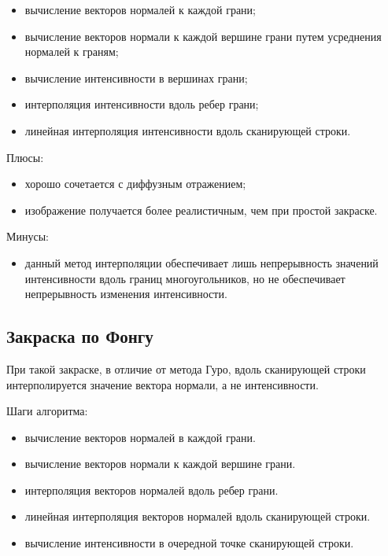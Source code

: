 \begin{itemize}
	\item вычисление векторов нормалей к каждой грани;
	\item вычисление векторов нормали к каждой вершине грани путем усреднения нормалей к граням;
	\item вычисление интенсивности в вершинах грани;
	\item интерполяция интенсивности вдоль ребер грани;
	\item линейная интерполяция интенсивности вдоль сканирующей строки.
\end{itemize}

Плюсы:

\begin{itemize}
	\item хорошо сочетается с диффузным отражением;
	\item изображение получается более реалистичным, чем при простой закраске.
\end{itemize}

Минусы:

\begin{itemize}
	\item данный метод интерполяции обеспечивает лишь непрерывность значений интенсивности вдоль границ многоугольников, но не обеспечивает непрерывность изменения интенсивности.
\end{itemize}


\subsection{Закраска по Фонгу}

При такой закраске, в отличие от метода Гуро, вдоль сканирующей строки интерполируется значение вектора нормали, а не интенсивности. 

Шаги алгоритма:

\begin{itemize}
	\item вычисление векторов нормалей в каждой грани.
	\item вычисление векторов нормали к каждой вершине грани.
	\item интерполяция векторов нормалей вдоль ребер грани.
	\item линейная интерполяция векторов нормалей вдоль сканирующей строки.
	\item вычисление интенсивности в очередной точке сканирующей строки.
\end{itemize}

